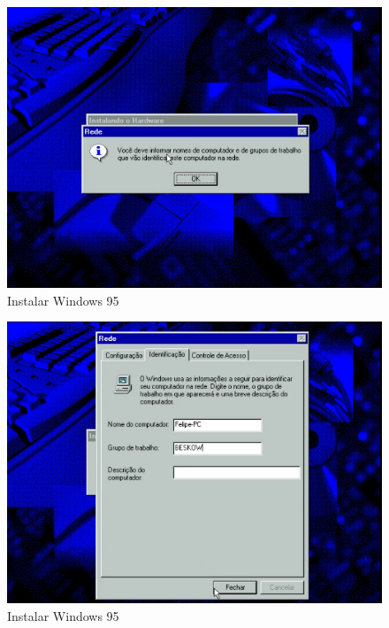 \documentclass{report}
\begin{document}
\begin{figure}
\centering
\includegraphics[width=\textwidth]{Screenshot_46.png}
\caption{Instalar Windows 95}
\label{fig:46}
\end{figure}

\begin{figure}
\centering
\includegraphics[width=\textwidth]{Screenshot_47.png}
\caption{Instalar Windows 95}
\label{fig:47}
\end{figure}
\end{document}
